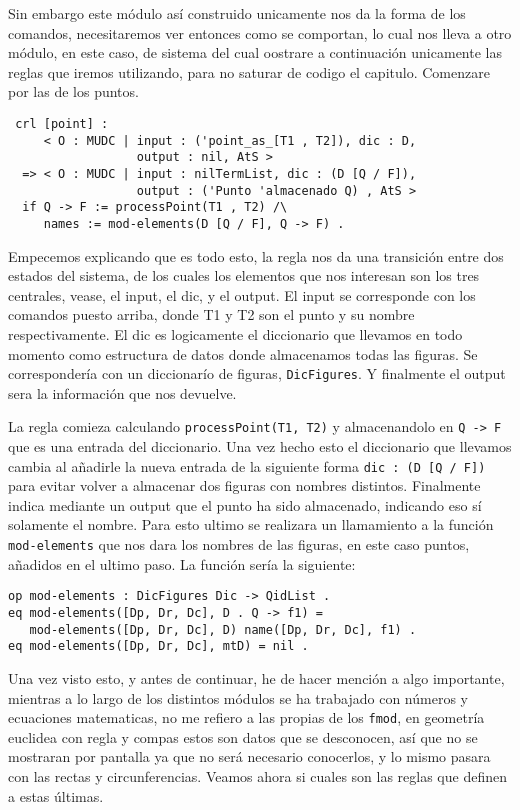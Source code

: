 Sin embargo este módulo así construido unicamente nos da la forma de los comandos, necesitaremos ver entonces como se comportan, lo cual nos lleva a otro módulo, en este caso, de sistema del cual oostrare a continuación unicamente las reglas que iremos utilizando, para no saturar de codigo el capitulo. Comenzare por las de los puntos.\par
{\codesize
\begin{verbatim}
 crl [point] :
     < O : MUDC | input : ('point_as_[T1 , T2]), dic : D,
                  output : nil, AtS >
  => < O : MUDC | input : nilTermList, dic : (D [Q / F]),
                  output : ('Punto 'almacenado Q) , AtS >
  if Q -> F := processPoint(T1 , T2) /\
     names := mod-elements(D [Q / F], Q -> F) .
\end{verbatim}
}
Empecemos explicando que es todo esto, la regla nos da una transición entre dos estados del sistema, de los cuales los elementos que nos interesan son los tres centrales, vease, el input, el dic, y el output. El input se corresponde con los comandos puesto arriba, donde T1 y T2 son el punto y su nombre respectivamente. El dic es logicamente el diccionario que llevamos en todo momento como estructura de datos donde almacenamos todas las figuras. Se correspondería con un diccionarío de figuras, \texttt{DicFigures}. Y finalmente el output sera la información que nos devuelve. \par

La regla comieza calculando \texttt{processPoint(T1, T2)} y almacenandolo en \texttt{Q -> F} que es una entrada del diccionario. Una vez hecho esto el diccionario que llevamos cambia al añadirle la nueva entrada de la siguiente forma \verb"dic : (D [Q / F])" para evitar volver a almacenar dos figuras con nombres distintos. Finalmente indica mediante un output que el punto ha sido almacenado, indicando eso sí solamente el nombre. Para esto ultimo se realizara un llamamiento a la función \texttt{mod-elements} que nos dara los nombres de las figuras, en este caso puntos, añadidos en el ultimo paso. La función sería la siguiente: \par

{\codesize
\begin{verbatim}
op mod-elements : DicFigures Dic -> QidList .
eq mod-elements([Dp, Dr, Dc], D . Q -> f1) = 
   mod-elements([Dp, Dr, Dc], D) name([Dp, Dr, Dc], f1) .
eq mod-elements([Dp, Dr, Dc], mtD) = nil .
\end{verbatim}
}

Una vez visto esto, y antes de continuar, he de hacer mención a algo importante, mientras a lo largo de los distintos módulos se ha trabajado con números y ecuaciones matematicas, no me refiero a las propias de los \texttt{fmod}, en geometría euclidea con regla y compas estos son datos que se desconocen, así que no se mostraran por pantalla ya que no será necesario conocerlos, y lo mismo pasara con las rectas y circunferencias. Veamos ahora si cuales son las reglas que definen a estas últimas.\par 

